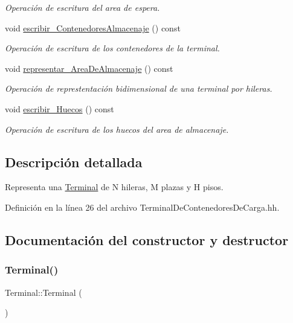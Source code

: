 \begin{DoxyCompactItemize}
\begin{DoxyCompactList}\small\item\em Operación de escritura del area de espera. \end{DoxyCompactList}\item 
void \hyperlink{class_terminal_a24c74e2dd8c8e41452a7e890bc925f0e}{escribir\+\_\+\+Contenedores\+Almacenaje} () const
\begin{DoxyCompactList}\small\item\em Operación de escritura de los contenedores de la terminal. \end{DoxyCompactList}\item 
void \hyperlink{class_terminal_a32d375e8cecdafbbf0a291f646456dd6}{representar\+\_\+\+Area\+De\+Almacenaje} () const
\begin{DoxyCompactList}\small\item\em Operación de represtentación bidimensional de una terminal por hileras. \end{DoxyCompactList}\item 
void \hyperlink{class_terminal_afbfd7c045961e20718f9b5ffa1a31aa1}{escribir\+\_\+\+Huecos} () const
\begin{DoxyCompactList}\small\item\em Operación de escritura de los huecos del area de almacenaje. \end{DoxyCompactList}\end{DoxyCompactItemize}


\subsection{Descripción detallada}
Representa una \hyperlink{class_terminal}{Terminal} de N hileras, M plazas y H pisos. 

Definición en la línea 26 del archivo Terminal\+De\+Contenedores\+De\+Carga.\+hh.



\subsection{Documentación del constructor y destructor}
\mbox{\label{class_terminal_aa448509b5aa1ece53c3d86385655be0e}} 
\subsubsection{\texorpdfstring{Terminal()}{Terminal()}\hspace{0.1cm}{\footnotesize\ttfamily [1/3]}}
{\footnotesize\ttfamily Terminal\+::\+Terminal (\begin{DoxyParamCaption}{ }\end{DoxyParamCaption})}



